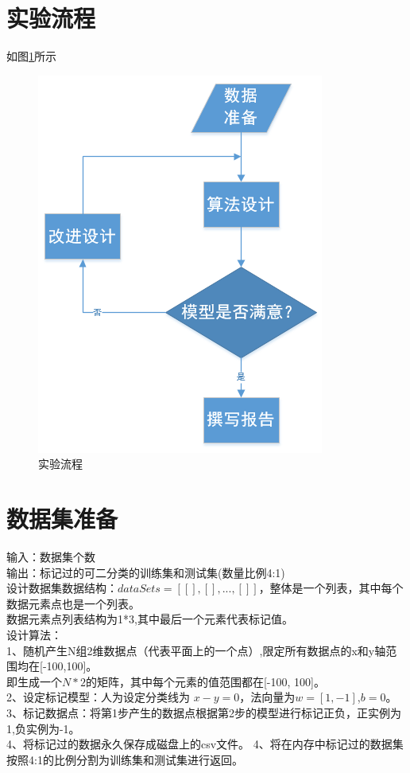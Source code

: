 \documentclass[UTF8,twoside,fontset=none,heading=true,scheme=chinese]{ctexart}
\begin{document}
    \section{实验流程}
    \noindent 如图\ref{fig:flow}所示
    \begin{figure}[htb]
        \centering
        \includegraphics[scale=0.7]{../flow.png}
        \caption{实验流程}
        \label{fig:flow}
    \end{figure}

    \section{数据集准备}
    \noindent 输入：数据集个数  \\
    输出：标记过的可二分类的训练集和测试集(数量比例4:1) \\
    设计数据集数据结构：$dataSets=[ [],[],...,[] ]$，整体是一个列表，其中每个数据元素点也是一个列表。 \\
    数据元素点列表结构为1*3,其中最后一个元素代表标记值。    \\
    设计算法：  \\
    1、随机产生N组2维数据点（代表平面上的一个点）,限定所有数据点的x和y轴范围均在[-100,100]。    \\
       即生成一个$N*2$的矩阵，其中每个元素的值范围都在[-100, 100]。    \\
    2、设定标记模型：人为设定分类线为 $x-y=0$，法向量为$w=[1, -1]$,$b=0$。   \\
    3、标记数据点：将第1步产生的数据点根据第2步的模型进行标记正负，正实例为1,负实例为-1。   \\
    4、将标记过的数据永久保存成磁盘上的csv文件。
    4、将在内存中标记过的数据集按照4:1的比例分割为训练集和测试集进行返回。
\end{document}
